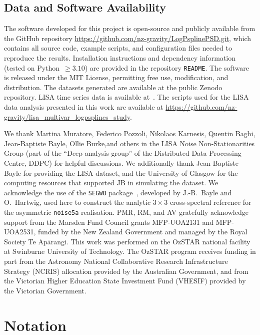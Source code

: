 \documentclass[%
	reprint,
	nofootinbib,
	amsmath,
	amssymb,
	aps,
]{revtex4-2}
\begin{document}
	\subsection*{Data and Software Availability}
	The software developed for this project is open-source and publicly available from the GitHub repository 
	\url{https://github.com/nz-gravity/LogPsplinePSD.git}, which contains all source code, example scripts, 
	and configuration files needed to reproduce the results. 
	Installation instructions and dependency information (tested on Python~$\geq 3.10$) are provided in the repository \texttt{README}. 
	The software is released under the MIT License, permitting free use, modification, and distribution. 
	The datasets generated are available at the public Zenodo repository.
	LISA time series data is available at~\citep{lisa_noise4a, lisa_noise5a}.
	The scripts used for the LISA data analysis presented in this work are available at
	\url{https://github.com/nz-gravity/lisa_multivar_logpsplines_study}.


	\begin{acknowledgments}
		We thank Martina Muratore, Federico Pozzoli, Nikolaos Karnesis, Quentin
		Baghi, Jean-Baptiste Bayle, Ollie Burke,and others in the LISA Noise Non-Stationarities
		Group (part of the ``Deep analysis group'' of the Distributed Data Processing
		Centre, DDPC) for helpful discussions. We additionally thank Jean-Baptiste
		Bayle for providing the LISA dataset, and the University of Glasgow for the computing
		resources that supported JB in simulating the dataset. We
		acknowledge the use of the \texttt{SEGWO}
		package~\citep{bayle_segwo}, developed by J.-B.~Bayle and
		O.~Hartwig, used here to construct the analytic $3\times3$
		cross-spectral reference for the asymmetric \texttt{noise5a}
		realisation. PMR, RM, and AV
		gratefully acknowledge support from the Marsden Fund Council grants MFP-UOA2131 and MFP-UOA2531,
		funded by the New Zealand Government and managed by the Royal Society Te Apārangi.
		This work was performed on the OzSTAR national facility at Swinburne
		University of Technology. The OzSTAR program receives funding in part from
		the Astronomy National Collaborative Research Infrastructure Strategy (NCRIS)
		allocation provided by the Australian Government, and from the Victorian Higher
		Education State Investment Fund (VHESIF) provided by the Victorian Government.
	\end{acknowledgments}

	\appendix

	\section{Notation}
	\label{app:notation}
\end{document}
